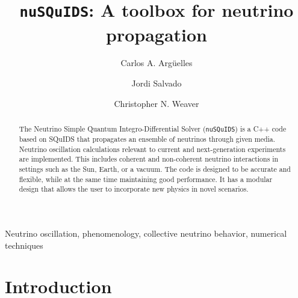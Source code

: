 \documentclass[3p,12pt]{elsarticle}
\begin{document}
\begin{frontmatter}

\title{\texttt{nuSQuIDS}: A toolbox for neutrino propagation}

\author[HU]{Carlos A. Arg\"uelles}
\author[UB]{Jordi Salvado}
\author[MSU]{Christopher N. Weaver}

\address[HU]{Department of Physics \& Laboratory for Particle Physics and Cosmology, Harvard University, Cambridge, MA 02138, USA}
\address[UB]{Departament de F\'isica Qu\`antica i Astrofísica and Institut de Ciencies del Cosmos,
Universitat de Barcelona, Diagonal 647, E-08028 Barcelona, Spain}
\address[MSU]{Dept. of Physics and Astronomy, Michigan State University, East Lansing, MI 48824, USA}


\begin{abstract}
The Neutrino Simple Quantum Integro-Differential Solver (\texttt{nuSQuIDS})
is a C++ code based on SQuIDS that propagates an ensemble of neutrinos
through given media. Neutrino oscillation calculations relevant to
current and next-generation experiments are implemented. 
This includes coherent and non-coherent neutrino interactions in
settings such as the Sun, Earth, or a vacuum.
The code is designed to be accurate and flexible, while at the
same time maintaining good performance. It has a modular design that
allows the user to incorporate new physics in novel scenarios. 
\end{abstract}

\begin{keyword}
Neutrino oscillation, phenomenology, collective neutrino behavior, numerical techniques
\end{keyword}

\end{frontmatter}

\hypersetup{linkcolor=black}
\tableofcontents
\hypersetup{linkcolor=blue}
\newpage
\section{Introduction}
\label{sec:intro} 
\end{document}
